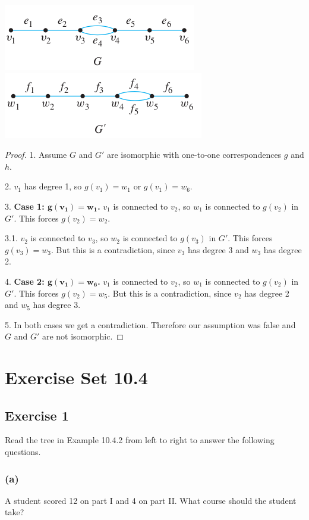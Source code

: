\documentclass[14pt]{extarticle}
\begin{document}
\includegraphics[scale=0.7]{../images/10.3.30.1.png} \includegraphics[scale=0.7]{../images/10.3.30.2.png}

\begin{proof}
1. Assume \(G\) and \(G'\) are isomorphic with one-to-one correspondences \(g\) and \(h\).

2. \(v_1\) has degree 1, so \(g(v_1) = w_1\) or \(g(v_1) = w_6\).

3. {\bf Case 1: \(\bm{g(v_1) = w_1}\).} \(v_1\) is connected to \(v_2\), so \(w_1\) is connected to \(g(v_2)\) in \(G'\).
This forces \(g(v_2) = w_2\).

3.1. \(v_2\) is connected to \(v_3\), so \(w_2\) is connected to \(g(v_3)\) in \(G'\). This forces \(g(v_3) = w_3\). But 
this is a contradiction, since \(v_3\) has degree 3 and \(w_3\) has degree 2.

4. {\bf Case 2: \(\bm{g(v_1) = w_6}\).} \(v_1\) is connected to \(v_2\), so \(w_1\) is connected to \(g(v_2)\) in \(G'\).
This forces \(g(v_2) = w_5\). But this is a contradiction, since \(v_2\) has degree 2 and \(w_5\) has degree 3.

5. In both cases we get a contradiction. Therefore our assumption was false and \(G\) and \(G'\) are not isomorphic.
\end{proof}

\section{Exercise Set 10.4}
\subsection{Exercise 1}
Read the tree in Example 10.4.2 from left to right to answer the following questions.

\subsubsection{(a)}
A student scored 12 on part I and 4 on part II. What course should the student take?
\end{document}
